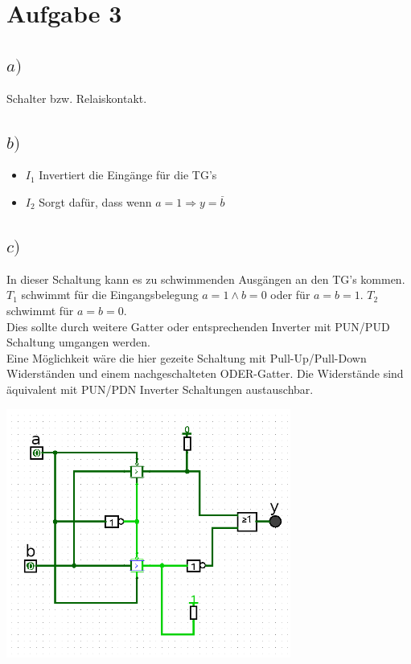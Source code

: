 \documentclass[a4paper]{scrartcl}
\begin{document}
\section*{Aufgabe 3}
\subsection*{$a)$}
Schalter bzw. Relaiskontakt.

\subsection*{$b)$}
\begin{itemize}
	\item $I_1$ Invertiert die Eingänge für die TG's
	\item $I_2$ Sorgt dafür, dass wenn $a=1 \Rightarrow y=\overset{\_}{b}$
\end{itemize}

\subsection*{$c)$}
In dieser Schaltung kann es zu schwimmenden Ausgängen an den TG's kommen.\\
$T_1$ schwimmt für die Eingangsbelegung $a=1 \land b=0$ oder für $a=b=1$. $T_2$ schwimmt für $a=b=0$.\\
Dies sollte durch weitere Gatter oder entsprechenden Inverter mit PUN/PUD Schaltung umgangen werden.\\
Eine Möglichkeit wäre die hier gezeite Schaltung mit Pull-Up/Pull-Down Widerständen und einem nachgeschalteten ODER-Gatter. Die Widerstände sind äquivalent mit PUN/PDN Inverter Schaltungen austauschbar.\\

\begin{center}
	\includegraphics[width=0.7\textwidth]{b6_a3.png}	
\end{center}
\end{document}

